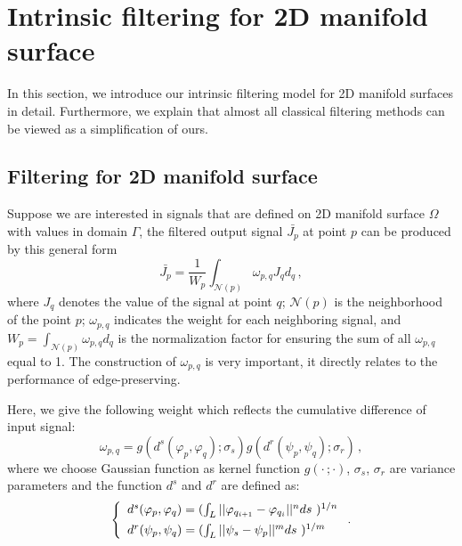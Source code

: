 \section{Intrinsic filtering for 2D manifold surface}

In this section, we introduce our intrinsic filtering model for 2D manifold surfaces in detail.
Furthermore, we explain that almost all classical filtering methods can be viewed as a simplification of ours.

\subsection{Filtering for 2D manifold surface}

Suppose we are interested in signals that are defined on 2D manifold surface $\Omega$ with values in domain $\Gamma$,
the filtered output signal $\bar{J_p}$ at point $p$ can be produced by this general form
\begin{equation}
\label{Eq:GeneralForm}
\bar{J_{p}} = \frac{1}{W_{p}}\int_{\mathcal{N}(p)}\omega_{p, q}J_{q}d_{q}\, ,
\end{equation}
where $J_{q}$ denotes the value of the signal at point $q$; $\mathcal{N}(p)$ is the neighborhood of the point $p$;
$\omega_{p, q}$ indicates the weight for each neighboring signal,
and $W_{p} = \int_{\mathcal{N}(p)}\omega_{p, q}d_{q}$ is the normalization factor for ensuring the sum of all $\omega_{p,q}$ equal to 1.
The construction of $\omega_{p,q}$ is very important, it directly relates to the performance of edge-preserving.

Here, we give the following weight which reflects the cumulative difference of input signal:
\begin{equation}
\label{Eq:IntrinsicWeight}
\omega_{p,q} = g(d^{s}(\varphi_{p}, \varphi_{q}); \sigma_{s})g(d^{r}(\psi_p, \psi_q); \sigma_{r})\, ,
\end{equation}
where we choose Gaussian function as kernel function $g(\cdot \,; \cdot)$, $\sigma_{s}$, $\sigma_{r}$ are variance parameters and the function $d^s$ and $d^r$ are defined as:
 \begin{equation}
 \label{Eq:IntrinsicDistance}
 \left \{
 \begin{array}{ll}
        d^{s}(\varphi_p, \varphi_q) = (\int_{L}||\varphi_{q_{i+1}} - \varphi_{q_i}||^{n}ds\,\,)^{1/n} \vspace{1.5mm} \\
        d^{r}(\psi_p, \psi_q) = (\int_{L}||\psi_{s} - \psi_{p}||^{m}ds\,\,)^{1/m} \\
 \end{array}
 \right. .
 \end{equation}

